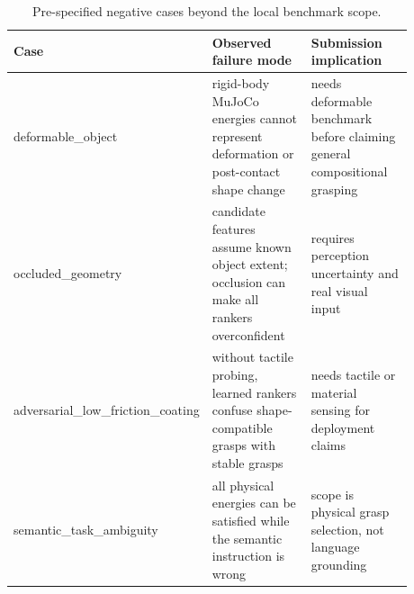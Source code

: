 \begin{table}[t]
\centering
\caption{Pre-specified negative cases beyond the local benchmark scope.}
\label{tab:negative-cases}
\scriptsize
\begin{tabular}{p{0.20\linewidth}p{0.34\linewidth}p{0.34\linewidth}}
\toprule
Case & Observed failure mode & Submission implication \\
\midrule
deformable\_object & rigid-body MuJoCo energies cannot represent deformation or post-contact shape change & needs deformable benchmark before claiming general compositional grasping \\
occluded\_geometry & candidate features assume known object extent; occlusion can make all rankers overconfident & requires perception uncertainty and real visual input \\
adversarial\_low\_friction\_coating & without tactile probing, learned rankers confuse shape-compatible grasps with stable grasps & needs tactile or material sensing for deployment claims \\
semantic\_task\_ambiguity & all physical energies can be satisfied while the semantic instruction is wrong & scope is physical grasp selection, not language grounding \\
\bottomrule
\end{tabular}
\end{table}
